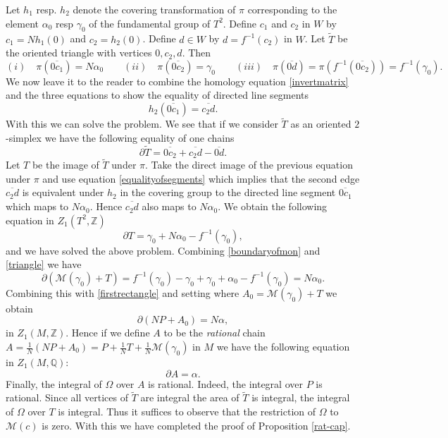 \documentclass[12pt,leqno]{amsart}
\numberwithin{equation}{section}
\theoremstyle{plain}
\theoremstyle{definition}
\theoremstyle{remark}
\newcommand{\Q}{\mathbb{Q}}
\newcommand{\Z}{\mathbb{Z}}
\begin{document}
Let $h_1$ resp. $h_2$ denote the covering transformation of $\pi$ corresponding to the element $\alpha_0$ resp $\gamma_0$ of the fundamental group of $T^2$. Define $c_1$ and $c_2$ in $W$ by $c_1 = Nh_1(0)$ and $c_2=h_2(0)$. Define $d \in W$ by $d =f^{-1}(c_2)$ in $W$. Let $\widetilde{T}$ be the oriented triangle
with vertices $0,c_2,d$.  Then
 \[
 (i) \quad \pi(\overline{0c_1}) =N\alpha_0 \qquad (ii) \quad \pi(\overline{0c_2})= \gamma_0 \qquad (iii) \quad 
 \pi(\overline{0d}) = \pi(f^{-1}(\overline{0c_2})) = f^{-1}(\gamma_0).
 \]
 We now leave it to the reader to combine the homology equation \eqref{invertmatrix} and the three equations to show the equality of directed line segments
\begin{equation}\label{equalityofsegments}
h_2( \overline{0c_1}) = \overline{c_2d}.
\end{equation}
With this we can solve the problem. 
We see that if we consider $\widetilde{T}$ as an oriented $2$-simplex we have the following equality of one chains
$$
\partial \widetilde{T} = \overline{0c_2} + \overline{c_2d} - \overline{0d}.
$$
Let $T$ be the image of $\widetilde{T}$ under $\pi$. Take the direct image of the previous equation under $\pi$ and use equation \eqref{equalityofsegments} which implies that the second edge $\overline{c_2d}$ is equivalent under $h_2$ in the covering group to the directed line segment $\overline{0c_1}$ which maps to $N\alpha_0$. Hence $\overline{c_2d}$ also maps to $N\alpha_0$. We obtain  the following equation in $Z_1(T^2,\Z)$
\begin{equation}\label{triangle}
\partial T =  \gamma_0 + N \alpha_0 - f^{-1}(\gamma_0),
\end{equation}
and we have solved the above problem. Combining \eqref{boundaryofmon} and \eqref{triangle} we have
$$
\partial (\mathcal{M}(\gamma_0) + T ) = f^{-1}(\gamma_0) -\gamma_0 +\gamma_0 + \alpha_0 - f^{-1}(\gamma_0)= N\alpha_0.
$$
Combining this with \eqref{firstrectangle} and setting where $A_0 = \mathcal{M}(\gamma_0) +T$ we obtain
\begin{equation} \label{cap}
\partial (NP + A_0 ) = N \alpha,
\end{equation}
in $Z_1(M,\Z)$. Hence if we define $A$ to be the  {\it rational} chain $A = \frac{1}{N} (NP + A_0) = P + \frac{1}{N}T + \frac{1}{N} \mathcal{M}(\gamma_0)$ in $M$ we have the following equation in $Z_1(M,\Q)$:
$$
\partial A = \alpha.
$$
Finally, the integral of $\Omega$ over $A$ is rational. Indeed, the integral over $P$ is rational.  Since all vertices of $\widetilde{T}$  are integral the area of $\widetilde{T}$ is integral, the integral of $\Omega$ over $T$ is integral. Thus it suffices to observe that the restriction of $\Omega$ to $\mathcal{M}(c)$ is zero. With this we have completed the proof of Proposition \ref{rat-cap}. 
\end{document}
